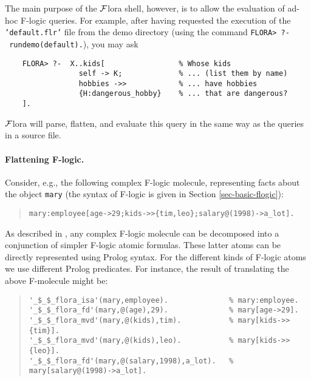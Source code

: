\documentclass[11pt]{article}
\newcommand{\FLORA}{{\mbox{${\cal F}${\sc lora}}}\xspace}
\newcommand{\fl}{{F-logic}\xspace}
\begin{document}
The main purpose of the \FLORA shell, however, is to allow the evaluation
of ad-hoc F-logic queries. For example, after having requested the
execution of the \texttt{'default.flr'} file from the demo directory (using
the command \texttt{FLORA>~?-~rundemo(default).}), you may ask
\begin{verbatim}
    FLORA> ?-  X..kids[                 % Whose kids
                 self -> K;             % ... (list them by name)
                 hobbies ->>            % ... have hobbies
                 {H:dangerous_hobby}    % ... that are dangerous?
    ]. 
\end{verbatim}
\FLORA will parse, flatten, and evaluate this query in the same way as
the queries in a source file.


\paragraph{Flattening F-logic.}

Consider, e.g., the following complex F-logic molecule, representing
facts about the object \texttt{mary} (the syntax of \fl is given in
Section \ref{sec-basic-flogic}):

\begin{quote}
{\small\begin{verbatim}
mary:employee[age->29;kids->>{tim,leo};salary@(1998)->a_lot].
\end{verbatim}}
\end{quote}

As described in \cite{KLW95}, any complex F-logic molecule can be
decomposed into a conjunction of simpler F-logic atomic formulas. These
latter atoms can be directly represented using Prolog syntax.  For the
different kinds of F-logic atoms we use different Prolog predicates. For
instance, the result of translating the above F-molecule might be:

\begin{quote}
{\small
\begin{verbatim}
'_$_$_flora_isa'(mary,employee).              % mary:employee.
'_$_$_flora_fd'(mary,@(age),29).              % mary[age->29].
'_$_$_flora_mvd'(mary,@(kids),tim).           % mary[kids->>{tim}].
'_$_$_flora_mvd'(mary,@(kids),leo).           % mary[kids->>{leo}].
'_$_$_flora_fd'(mary,@(salary,1998),a_lot).   % mary[salary@(1998)->a_lot].
\end{verbatim}
  }
\end{quote}
\end{document}
